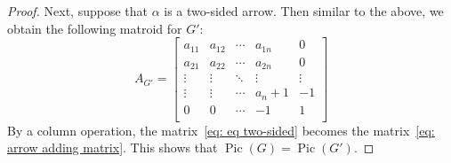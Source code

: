 \documentclass[11pt,reqno]{amsart}
\DeclareMathOperator{\Pic}{Pic}
\theoremstyle{definition}
\theoremstyle{plain}
\begin{document}
\begin{proof}
		Next, suppose that $\alpha$ is a two-sided arrow. Then similar to the above, we obtain the following matroid for $G'$:
		\begin{equation}\label{eq: eq two-sided}
			A_{G'}=\left[\begin{array}{ccc|c|c}
				a_{11}&a_{12}&\cdots &a_{1n}&0\\
				a_{21}&a_{22}&\cdots &a_{2n}&0\\
				\vdots & \vdots &\ddots & \vdots & \vdots \\ \hline
				\vdots & \vdots & \cdots&a_n+1 & -1\\ \hline
				0&0&\cdots &-1&1\\
			\end{array}\right]
		\end{equation}
		By a column operation, the matrix~\eqref{eq: eq two-sided} becomes the matrix~\eqref{eq: arrow adding matrix}.
		This shows that $\Pic(G)=\Pic(G')$.
	\end{proof}
\end{document}
